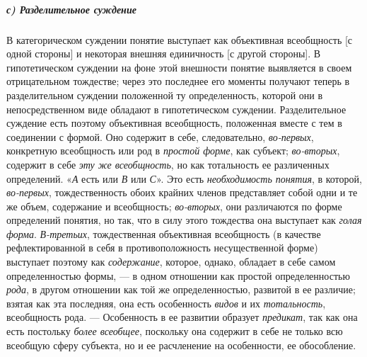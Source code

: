 \documentclass[twoside]{article}
\begin{document}
{{\subparagraph[с) Разделительное суждение]{с) Разделительное суждение}
В категорическом суждении понятие выступает как объективная
всеобщность [с одной стороны] и некоторая внешняя единичность [с другой
стороны]. В гипотетическом суждении на фоне этой внешности понятие
выявляется в своем отрицательном тождестве; через это последнее его моменты
получают теперь в разделительном суждении положенной ту определенность,
которой они в непосредственном виде обладают в гипотетическом суждении.
Разделительное суждение есть поэтому объективная всеобщность, положенная
вместе с тем в соединении с формой. Оно содержит в себе, следовательно,
{\em во-первых},
конкретную всеобщность или род в
{\em простой форме}, как
субъект; {\em во-вторых},
содержит в себе {\em эту
же всеобщность}, но как тотальность ее
различенных определений.
«{\em А} есть или
{\em В} или
{\em С}». Это есть
{\em необходимость понятия},
в которой,
{\em во-первых},
тождественность обоих крайних членов представляет собой одни
и те же объем, содержание и всеобщность;
{\em во-вторых}, они
различаются по форме определений понятия, но так, что в силу этого
тождества она выступает как {\em голая
форма}. {\em В-третьих},
тождественная объективная всеобщность (в качестве
рефлектированной в себя в противоположность несущественной форме) выступает
поэтому как {\em содержание},
которое, однако, обладает в себе самом определенностью
формы, — в одном отношении как простой определенностью
{\em рода}, в другом
отношении как той же определенностью, развитой в ее различие; взятая как
эта последняя, она есть особенность
{\em видов} и их
{\em тотальность},
всеобщность рода. — Особенность в ее развитии
образует {\em предикат},
так как она есть постольку
{\em более всеобщее},
поскольку она содержит в себе не только всю всеобщую сферу
субъекта, но и ее расчленение на особенности, ее обособление.

}}
\end{document}
